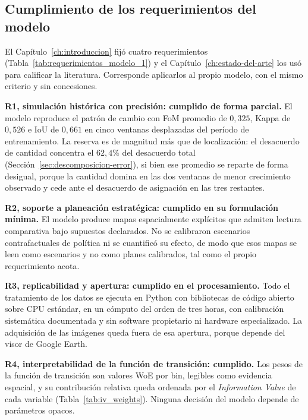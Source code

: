 
\subsection{Cumplimiento de los requerimientos del modelo}

El Capítulo~\ref{ch:introduccion} fijó cuatro requerimientos (Tabla~\ref{tab:requerimientos_modelo_1}) y el Capítulo~\ref{ch:estado-del-arte} los usó para calificar la literatura. Corresponde aplicarlos al propio modelo, con el mismo criterio y sin concesiones.

\textbf{R1, simulación histórica con precisión: cumplido de forma parcial.} El modelo reproduce el patrón de cambio con FoM promedio de $0{,}325$, Kappa de $0{,}526$ e IoU de $0{,}661$ en cinco ventanas desplazadas del período de entrenamiento. La reserva es de magnitud más que de localización: el desacuerdo de cantidad concentra el $62{,}4\%$ del desacuerdo total (Sección~\ref{sec:descomposicion-error}), si bien ese promedio se reparte de forma desigual, porque la cantidad domina en las dos ventanas de menor crecimiento observado y cede ante el desacuerdo de asignación en las tres restantes.

\textbf{R2, soporte a planeación estratégica: cumplido en su formulación mínima.} El modelo produce mapas espacialmente explícitos que admiten lectura comparativa bajo supuestos declarados. No se calibraron escenarios contrafactuales de política ni se cuantificó su efecto, de modo que esos mapas se leen como escenarios y no como planes calibrados, tal como el propio requerimiento acota.

\textbf{R3, replicabilidad y apertura: cumplido en el procesamiento.} Todo el tratamiento de los datos se ejecuta en Python con bibliotecas de código abierto sobre CPU estándar, en un cómputo del orden de tres horas, con calibración sistemática documentada y sin software propietario ni hardware especializado. La adquisición de las imágenes queda fuera de esa apertura, porque depende del visor de Google Earth.

\textbf{R4, interpretabilidad de la función de transición: cumplido.} Los pesos de la función de transición son valores WoE por bin, legibles como evidencia espacial, y su contribución relativa queda ordenada por el \textit{Information Value} de cada variable (Tabla~\ref{tab:iv_weights}). Ninguna decisión del modelo depende de parámetros opacos.

